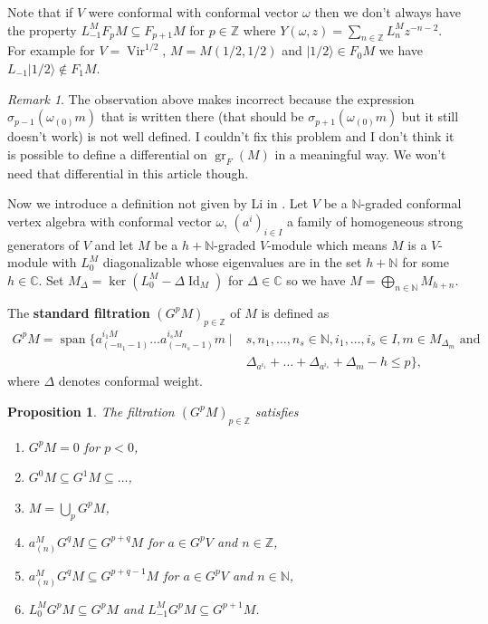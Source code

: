 \documentclass[12pt, a4paper]{article}
\newtheorem{proposition}[theorem]{Proposition}
\theoremstyle{remark}
\newtheorem{remark}[theorem]{Remark}
\DeclareMathOperator{\Vir}{Vir}
\DeclareMathOperator{\Id}{Id}
\DeclareMathOperator{\gr}{gr}
\DeclareMathOperator{\vspan}{span}
\newcommand{\vachalf}{|1/2\rangle}
\begin{document}
Note that if $V$ were conformal with conformal vector $\omega$ then we don't always have the property $L_{-1}^MF_pM \subseteq F_{p + 1}M$ for $p \in \mathbb{Z}$ where $Y(\omega, z)=\sum_{n \in \mathbb{Z}}L^M_nz^{-n - 2}$.
For example for $V = \Vir^{1/2}$, $M = M(1/2, 1/2)$ and $\vachalf \in F_0M$ we have $L_{-1}\vachalf \notin F_1M$.

\begin{remark}
  \label{rmk:5}
  The observation above makes \cite[Lemma 3.1.2]{arakawa_remark_2012} incorrect because the expression $\sigma_{p - 1}(\omega_{(0)}m)$ that is written there (that should be $\sigma_{p + 1}(\omega_{(0)}m)$ but it still doesn't work) is not well defined.
  I couldn't fix this problem and I don't think it is possible to define a differential on $\gr_F(M)$ in a meaningful way.
  We won't need that differential in this article though.
\end{remark}

Now we introduce a definition not given by Li in \cite{li_vertex_2004}.
Let $V$ be a $\mathbb{N}$-graded conformal vertex algebra with conformal vector $\omega$, $(a^i)_{i\in I}$ a family of homogeneous strong generators of $V$ and let $M$ be a $h+\mathbb{N}$-graded $V$-module which means $M$ is a $V$-module with $L_0^M$ diagonalizable whose eigenvalues are in the set $h + \mathbb{N}$ for some $h \in \mathbb{C}$.
Set $M_\Delta = \ker(L^M_0 - \Delta\Id_M)$ for $\Delta \in \mathbb{C}$ so we have $M = \bigoplus_{n \in \mathbb{N}}M_{h + n}$.

The \textbf{standard filtration} $(G^pM)_{p \in \mathbb{Z}}$ of $M$ is defined as
\begin{equation*}
  \begin{split}
    G^pM = \vspan\{a^{i_1M}_{(-n_1 - 1)}\dots a^{i_sM}_{(-n_s - 1)}m \mid& s, n_1, \dots, n_s \in \mathbb{N}, i_1, \dots, i_s \in I, m \in M_{\Delta_m} \text{ and }\\
    &\Delta_{a^{i_1}} + \dots + \Delta_{a^{i_s}} + \Delta_m - h \le p\},
  \end{split}
\end{equation*}
where $\Delta$ denotes conformal weight.

\begin{proposition}
  \label{prp:5}
  The filtration $(G^pM)_{p\in \mathbb{Z}}$ satisfies
  \begin{enumerate}[label={(\alph*)}]
  \item $G^pM = 0$ for $p < 0$,
  \item $G^0M \subseteq G^1M \subseteq \dots$,
  \item $M = \bigcup_pG^pM$,
  \item $a^M_{(n)}G^qM \subseteq G^{p+q}M$ for $a \in G^pV$ and $n \in \mathbb{Z}$,
  \item $a^M_{(n)}G^qM \subseteq G^{p+q-1}M$ for $a \in G^pV$ and $n \in \mathbb{N}$,
  \item $L^M_0G^pM \subseteq G^pM$ and $L^M_{-1}G^pM \subseteq G^{p + 1}M$.
  \end{enumerate}
\end{proposition}
\end{document}
